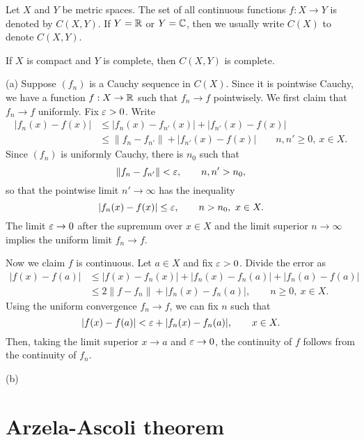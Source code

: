 \documentclass{../../large}
\begin{document}
\begin{prb}
Let $X$ and $Y$ be metric spaces.
The set of all continuous functions $f:X\to Y$ is denoted by $C(X,Y)$.
If $Y=\mathbb{R}$ or $Y=\mathbb{C}$, then we usually write $C(X)$ to denote $C(X,Y)$.
\begin{parts}
\item If $X$ is compact and $Y$ is complete, then $C(X,Y)$ is complete.
\end{parts}
\end{prb}
\begin{pf}
(a)
Suppose $(f_n)$ is a Cauchy sequence in $C(X)$.
Since it is pointwise Cauchy, we have a function $f:X\to\mathbb{R}$ such that $f_n\to f$ pointwisely.
We first claim that $f_n\to f$ uniformly.
Fix $\varepsilon>0$.
Write
\begin{align*}
|f_n(x)-f(x)|
&\le|f_n(x)-f_{n'}(x)|+|f_{n'}(x)-f(x)|\\
&\le\|f_n-f_{n'}\|+|f_{n'}(x)-f(x)|\qquad n,n'\ge0,\ x\in X.
\end{align*}
Since $(f_n)$ is uniformly Cauchy, there is $n_0$ such that
\[\|f_n-f_{n'}\|<\varepsilon,\qquad n,n'>n_0,\]
so that the pointwise limit $n'\to\infty$ has the inequality
\[|f_n(x)-f(x)|\le\varepsilon,\qquad n>n_0,\ x\in X.\]
The limit $\varepsilon\to0$ after the supremum over $x\in X$ and the limit superior $n\to\infty$ implies the uniform limit $f_n\to f$.

Now we claim $f$ is continuous.
Let $a\in X$ and fix $\varepsilon>0$.
Divide the error as
\begin{align*}
|f(x)-f(a)|
&\le|f(x)-f_n(x)|+|f_n(x)-f_n(a)|+|f_n(a)-f(a)|\\
&\le2\|f-f_n\|+|f_n(x)-f_n(a)|,\qquad n\ge0,\ x\in X.
\end{align*}
Using the uniform convergence $f_n\to f$, we can fix $n$ such that
\[|f(x)-f(a)|<\varepsilon+|f_n(x)-f_n(a)|,\qquad x\in X.\]
Then, taking the limit superior $x\to a$ and $\varepsilon\to0$, the continuity of $f$ follows from the continuity of $f_n$.

(b)

\end{pf}

\begin{prb}
\end{prb}





\section{Arzela-Ascoli theorem}
\end{document}
